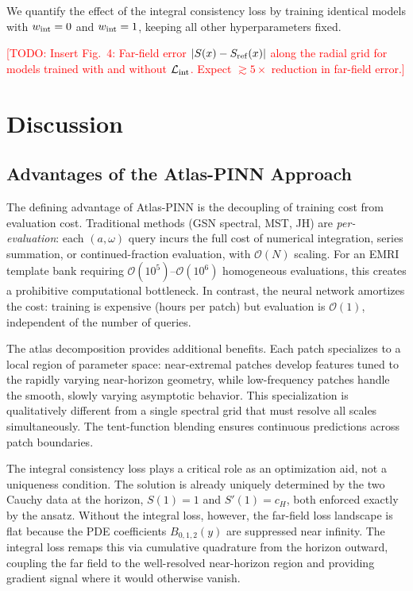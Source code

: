 \documentclass[aps,prd,twocolumn,superscriptaddress,nofootinbib]{revtex4-2}
\newcommand{\TODO}[1]{\textcolor{red}{[TODO: #1]}}
\begin{document}
We quantify the effect of the integral consistency loss by training identical
models with $w_{\rm int} = 0$ and $w_{\rm int} = 1$, keeping all other
hyperparameters fixed.

\TODO{Insert Fig.~4: Far-field error $|S(x) - S_{\rm ref}(x)|$ along the
radial grid for models trained with and without $\mathcal{L}_{\rm int}$.
Expect $\gtrsim 5\times$ reduction in far-field error.}

\section{Discussion}
\label{sec:discussion}

\subsection{Advantages of the Atlas-PINN Approach}

The defining advantage of Atlas-PINN is the decoupling of training cost from
evaluation cost.  Traditional methods (GSN spectral, MST, JH) are
\emph{per-evaluation}: each $(a,\omega)$ query incurs the full cost of numerical
integration, series summation, or continued-fraction evaluation, with
$\mathcal{O}(N)$ scaling.  For an EMRI template bank requiring
$\mathcal{O}(10^{5})$--$\mathcal{O}(10^{6})$ homogeneous evaluations, this
creates a prohibitive computational bottleneck.  In contrast, the neural network
amortizes the cost: training is expensive (hours per patch) but evaluation is
$\mathcal{O}(1)$, independent of the number of queries.

The atlas decomposition provides additional benefits.  Each patch specializes to
a local region of parameter space: near-extremal patches develop features tuned
to the rapidly varying near-horizon geometry, while low-frequency patches handle
the smooth, slowly varying asymptotic behavior.  This specialization is
qualitatively different from a single spectral grid that must resolve all scales
simultaneously.  The tent-function blending ensures continuous predictions
across patch boundaries.

The integral consistency loss plays a critical role as an optimization aid, not
a uniqueness condition.  The solution is already uniquely determined by the two
Cauchy data at the horizon, $S(1)=1$ and $S'(1)=c_H$, both enforced exactly by
the ansatz.  Without the integral loss, however, the far-field loss landscape
is flat because the PDE coefficients $B_{0,1,2}(y)$ are suppressed near
infinity.  The integral loss remaps this via cumulative quadrature from the
horizon outward, coupling the far field to the well-resolved near-horizon
region and providing gradient signal where it would otherwise vanish.
\end{document}
